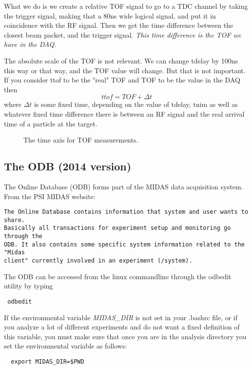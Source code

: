 \documentclass[11pt]{report}
\begin{document}
What we do is we create a relative TOF signal to go to a TDC channel
by taking the trigger signal, making that a 80ns wide logical signal,
and put it in coincidence with the RF signal.
Then we get the time difference between the closest beam packet, and
the trigger signal.
{\it This time difference is the TOF we have in the DAQ.}

The absolute scale of the TOF is not relevant. We can change tdelay by
100ns this way or that way, and the TOF value will change.
But that is not important. 
If you consider ttof to be the "real" TOF
and TOF to be the value in the DAQ
then 
\begin{equation}
ttof = TOF + \Delta t
\end{equation}
where $\Delta t$ is some fixed time, depending on the value of tdelay,
tnim as well as whatever fixed time difference there is between an RF
signal and the real arrival time of a particle at the target. 

\begin{figure}
\centerline{\vspace{0cm}\hspace{0cm}
}
\centering
\caption{The time axis for TOF measurements.}
\label{fig:timeplot}
\end{figure} 




\subsection{The ODB (2014 version)}\label{sec:ODB}

The Online Database (ODB) forms part of the MIDAS data acquisition system.
From the PSI MIDAS website:
\begin{verbatim}
The Online Database contains information that system and user wants to share. 
Basically all transactions for experiment setup and monitoring go through the 
ODB. It also contains some specific system information related to the "Midas 
client" currently involved in an experiment (/system).
\end{verbatim}
The ODB can be accessed from the linux commandline through the odbedit utility by typing
\begin{verbatim} odbedit \end{verbatim}
If the environmental variable {\it MIDAS\_DIR} is not set in your .bashrc file, or 
if you analyze a lot of different experiments and do not want a fixed definition
of this variable, you must make sure that once you are in the analysis directory
you set the environmental variable as follows:
\begin{verbatim}  export MIDAS_DIR=$PWD  \end{verbatim}
\end{document}

